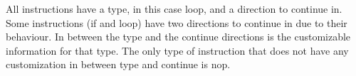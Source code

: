 All instructions have a type, in this case loop, and a direction to continue in. Some instructions (if and loop) have two directions to continue in due to their behaviour. In between the type and the continue directions is the customizable information for that type. The only type of instruction that does not have any customization in between type and continue is nop.